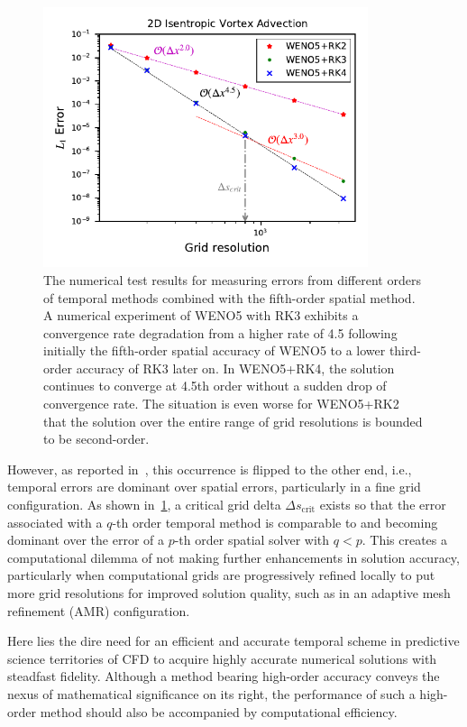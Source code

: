 \begin{figure}
    \centering
    \includegraphics[width=0.85\textwidth]{fig/weno5_vortex_error_sat}
    \caption{The numerical test results for measuring errors from
        different orders of temporal methods combined with the fifth-order spatial method.
        A numerical experiment of WENO5 with RK3 exhibits
        a convergence rate degradation from a higher rate of 4.5
        following initially the fifth-order spatial accuracy of WENO5
        to a lower third-order accuracy of RK3 later on.
        In WENO5+RK4, the solution continues to converge at 4.5th order without
        a sudden drop of convergence rate. The situation is even worse for WENO5+RK2 that
        the solution over the entire range of grid resolutions is bounded to be second-order.
    }\label{fig:vortex_error_saturation}
\end{figure}
However, as reported in~\cite{lee2021recursive}, this occurrence is flipped to the other end,
i.e., temporal errors are dominant over spatial errors,
particularly in a fine grid configuration.
As shown in~\cref{fig:vortex_error_saturation}, a critical grid delta \( \Delta s_{\text{crit}} \)
exists so that the error associated with a \( q \)-th order temporal method
is comparable to and becoming dominant over the error of a \( p \)-th order spatial solver
with \( q < p \). This creates a computational dilemma of not making further enhancements
in solution accuracy, particularly when computational grids are progressively refined locally
to put more grid resolutions for improved solution quality,
such as in an adaptive mesh refinement (AMR) configuration.

Here lies the dire need for an efficient and accurate temporal scheme
in predictive science territories of CFD to acquire highly accurate numerical solutions with steadfast fidelity.
Although a method bearing high-order accuracy conveys the nexus of mathematical significance
on its right, the performance of such a high-order method should also be accompanied by computational efficiency.


